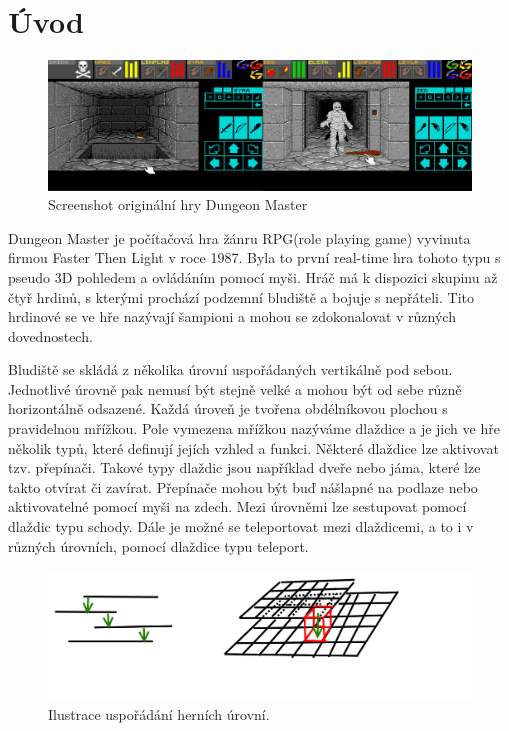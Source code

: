 \chapter{Úvod}

\begin{figure}[H]\centering
\includegraphics[width=\textwidth]{./img/DM-original-screen.png}
\caption{Screenshot originální hry Dungeon Master}
\label{obr0:uvod}
\end{figure}

Dungeon Master je počítačová hra žánru RPG(role playing game) vyvinuta firmou Faster Then Light v roce 1987.
Byla to první real-time hra tohoto typu s pseudo 3D pohledem a ovládáním pomocí myši. Hráč má k dispozici skupinu až čtyř hrdinů,
s kterými prochází podzemní bludiště a bojuje s nepřáteli. Tito hrdinové se ve hře nazývají šampioni a mohou se 
zdokonalovat v různých dovednostech. 

Bludiště se skládá z několika úrovní uspořádaných vertikálně pod sebou. 
Jednotlivé úrovně pak nemusí být stejně velké a mohou být od sebe různě horizontálně odsazené.
Každá úroveň je tvořena obdélníkovou plochou s pravidelnou mřížkou. Pole vymezena mřížkou nazýváme dlaždice a je jich 
ve hře několik typů, které definují jejích vzhled a funkci. Některé dlaždice lze aktivovat tzv. přepínači. Takové typy dlaždic
jsou například dveře nebo jáma, které lze takto otvírat či zavírat. Přepínače mohou být buď nášlapné na podlaze nebo aktivovatelné
pomocí myši na zdech. Mezi úrovněmi lze sestupovat pomocí dlaždic typu schody.  Dále je možné se teleportovat mezi dlaždicemi, a to i v různých úrovních, pomocí dlaždice
typu teleport. 

\begin{figure}[H]\centering
\includegraphics[width=\textwidth]{./img/DM-levels.png}
\caption{Ilustrace uspořádání herních úrovní.}
\label{obr1:uvod}
\end{figure}

